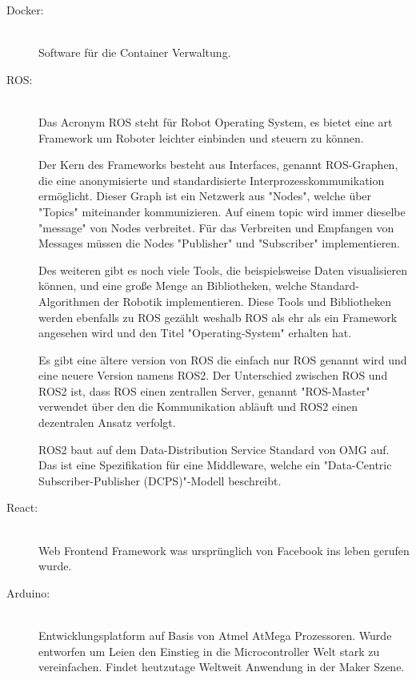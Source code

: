 \begin{flushleft}
    \begin{description}
        \item[Docker:]\hfill\\
        Software für die Container Verwaltung.

        \item[ROS:]\hfill\\
        Das Acronym ROS steht für Robot Operating System, es bietet eine art Framework um Roboter leichter
        einbinden und steuern zu können.

        Der Kern des Frameworks besteht aus Interfaces, genannt ROS-Graphen, die eine anonymisierte und standardisierte Interprozesskommunikation ermöglicht.
        Dieser Graph ist ein Netzwerk aus "Nodes", welche über "Topics" miteinander kommunizieren.
        Auf einem topic wird immer dieselbe "message" von Nodes verbreitet. 
        Für das Verbreiten und Empfangen von Messages müssen die Nodes "Publisher" und "Subscriber" implementieren.

        Des weiteren gibt es noch viele Tools, die beispielsweise Daten visualisieren können, und eine große Menge an Bibliotheken, welche Standard-Algorithmen der Robotik implementieren.
        Diese Tools und Bibliotheken werden ebenfalls zu ROS gezählt weshalb ROS als ehr als ein Framework angesehen wird und den Titel "Operating-System" erhalten hat.

        Es gibt eine ältere version von ROS die einfach nur ROS genannt wird und eine neuere Version namens ROS2.
        Der Unterschied zwischen ROS und ROS2 ist, dass ROS einen zentrallen Server, genannt "ROS-Master" verwendet über den die Kommunikation abläuft und ROS2 einen dezentralen Ansatz verfolgt.
        
        ROS2 baut auf dem Data-Distribution Service Standard von OMG auf. 
        Das ist eine Spezifikation für eine Middleware, welche ein "Data-Centric Subscriber-Publisher (DCPS)"-Modell beschreibt.


        \item[React:]\hfill\\
        Web Frontend Framework was ursprünglich von Facebook ins leben gerufen wurde.

        \item[Arduino:]\hfill\\
        Entwicklungsplatform auf Basis von Atmel AtMega Prozessoren. Wurde entworfen um Leien den Einstieg in die Microcontroller
        Welt stark zu vereinfachen. Findet heutzutage Weltweit Anwendung in der Maker Szene.


\end{description}
\end{flushleft}
